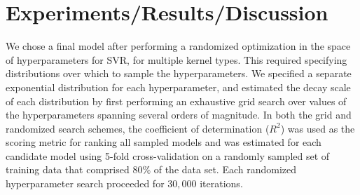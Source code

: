 \documentclass[12]{article}
\begin{document}
\section*{Experiments/Results/Discussion}

We chose a final model after performing a randomized optimization in the space of hyperparameters for SVR, for multiple kernel types. This required specifying distributions over which to sample the hyperparameters. We specified a separate exponential distribution for each hyperparameter, and estimated the decay scale of each distribution by first performing an exhaustive grid search over values of the hyperparameters spanning several orders of magnitude. In both the grid and randomized search schemes, the coefficient of determination ($R^2$) was used as the scoring metric for ranking all sampled models and was estimated for each candidate model using 5-fold cross-validation on a randomly sampled set of training data that comprised 80\% of the data set. Each randomized hyperparameter search proceeded for $30,000$ iterations.\\ 
\end{document}
